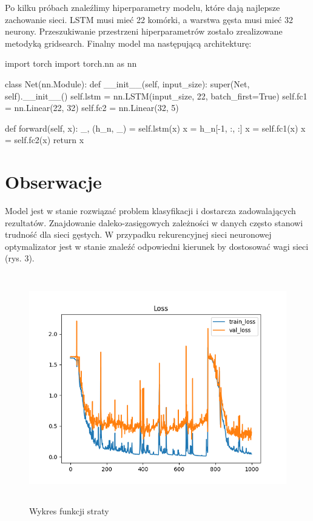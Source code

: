 \documentclass[10pt]{article}
\begin{document}
Po kilku próbach znaleźlimy hiperparametry modelu, które dają najlepsze zachowanie sieci. LSTM musi mieć 22 komórki, a warstwa gęsta musi mieć 32 neurony. Przeszukiwanie przestrzeni hiperparametrów zostało zrealizowane metodyką gridsearch. Finalny model ma następującą architekturę:

\begin{python}
import torch
import torch.nn as nn

class Net(nn.Module):
  def __init__(self, input_size):
      super(Net, self).__init__()
      self.lstm = nn.LSTM(input_size, 22, batch_first=True)
      self.fc1 = nn.Linear(22, 32)
      self.fc2 = nn.Linear(32, 5)

  def forward(self, x):
      _, (h_n, _) = self.lstm(x)
      x = h_n[-1, :, :]
      x = self.fc1(x)
      x = self.fc2(x)
      return x
\end{python}


\section{Obserwacje}

Model jest w stanie rozwiązać problem klasyfikacji i dostarcza zadowalających rezultatów. Znajdowanie daleko-zasięgowych zależności w danych często stanowi trudność dla sieci gęstych. W przypadku rekurencyjnej sieci neuronowej optymalizator jest w stanie znaleźć odpowiedni kierunek by dostosować wagi sieci (rys. 3).


\begin{figure}[H]
  \includegraphics[height=10cm]{loss.png}
  \centering
  \caption{Wykres funkcji straty}
\end{figure}
\end{document}

